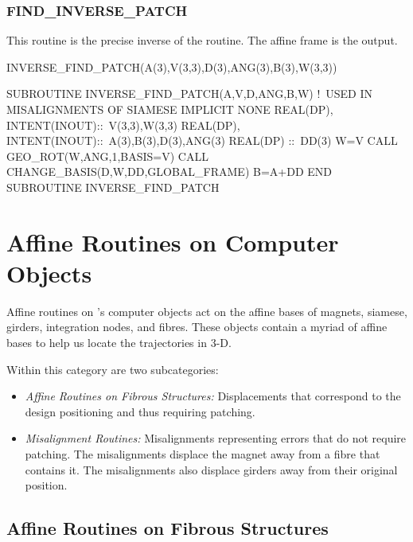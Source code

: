 \subsubsection{FIND\_INVERSE\_PATCH}

%
This routine is the precise inverse of the  routine.
The affine frame  is the output.

\begin{ptccode}
INVERSE_FIND_PATCH(A(3),V(3,3),D(3),ANG(3),B(3),W(3,3))
\end{ptccode}

\begin{ptccode}
SUBROUTINE INVERSE_FIND_PATCH(A,V,D,ANG,B,W)
  !\ USED IN MISALIGNMENTS OF SIAMESE
  IMPLICIT NONE
  REAL(DP), INTENT(INOUT)::\ V(3,3),W(3,3)
  REAL(DP), INTENT(INOUT)::\ A(3),B(3),D(3),ANG(3)
  REAL(DP) ::\  DD(3)
  W=V
  CALL GEO_ROT(W,ANG,1,BASIS=V)
  CALL CHANGE_BASIS(D,W,DD,GLOBAL_FRAME)
  B=A+DD
END SUBROUTINE INVERSE_FIND_PATCH
\end{ptccode}


\section{Affine Routines on Computer Objects}

%
Affine routines on \PTC's computer objects act on the affine bases of magnets,
siamese, girders, integration nodes, and fibres. These objects contain
a myriad of affine bases to help us locate the trajectories in 3-D.

Within this category are two subcategories:
\begin{itemize}
  \item \emph{Affine Routines on Fibrous Structures:} Displacements
that correspond to the design positioning and thus requiring patching.
  \item \emph{Misalignment Routines:} Misalignments representing errors
that do not require patching. The misalignments displace the magnet away
from a fibre that contains it. The misalignments also displace girders
away from their original position.
\end{itemize}


\subsection{Affine Routines on Fibrous Structures}

